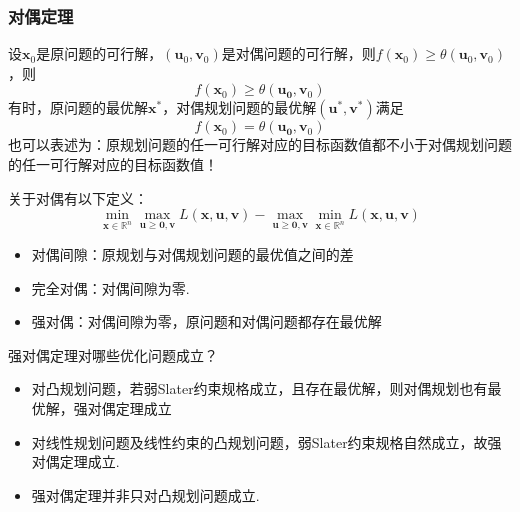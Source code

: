 \subsubsection{对偶定理}
\begin{theorem}[对偶定理]
    设$\boldsymbol{x}_0$是原问题的可行解，$(\boldsymbol{u}_0,\boldsymbol{v}_0)$是对偶问题的可行解，则$f(\boldsymbol{x}_0)\geqslant \theta(\boldsymbol{u}_0,\boldsymbol{v}_0)$，则
    \[
        f(\boldsymbol{x}_0)\geqslant \theta(\boldsymbol{u_0},\boldsymbol{v}_0)   
    \]
    有时，原问题的最优解$\boldsymbol{x}^*$，对偶规划问题的最优解$(\boldsymbol{u}^*,\boldsymbol{v}^*)$满足
    \[
        f(\boldsymbol{x}_0)= \theta(\boldsymbol{u_0},\boldsymbol{v}_0)     
    \]
    也可以表述为：原规划问题的任一可行解对应的目标函数值都不小于对偶规划问题的任一可行解对应的目标函数值！
\end{theorem}
\begin{definition}
    关于对偶有以下定义：
    \[
        \min_{\boldsymbol{x}\in\mathbb{R}^n}\max_{\boldsymbol{u}\geqslant \boldsymbol{0},\boldsymbol{v}}L(\boldsymbol{x},\boldsymbol{u},\boldsymbol{v})-\max_{\boldsymbol{u}\geqslant \boldsymbol{0},\boldsymbol{v}}\min_{\boldsymbol{x}\in\mathbb{R}^n}L(\boldsymbol{x},\boldsymbol{u},\boldsymbol{v})
    \]
    \begin{itemize}
        \item 对偶间隙：原规划与对偶规划问题的最优值之间的差
        \item 完全对偶：对偶间隙为零.
        \item 强对偶：对偶间隙为零，原问题和对偶问题都存在最优解
    \end{itemize}
\end{definition}
\begin{note}
    强对偶定理对哪些优化问题成立？
    \begin{itemize}
        \item 对凸规划问题，若弱Slater约束规格成立，且存在最优解，则对偶规划也有最优解，强对偶定理成立
        \item 对线性规划问题及线性约束的凸规划问题，弱Slater约束规格自然成立，故强对偶定理成立.
        \item 强对偶定理并非只对凸规划问题成立.
    \end{itemize}
\end{note}

